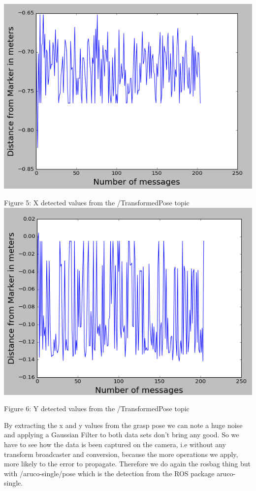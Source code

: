 \documentclass{article}
\begin{document}
\begin{center}
    \includegraphics[scale=0.5]{pic4.png}
    
    Figure 5: X detected values from the /TransformedPose topic
    \includegraphics[scale=0.5]{pic5.png}
    
    Figure 6: Y detected values from the /TransformedPose topic
\end{center}
By extracting the x and y values from the grasp pose we can note a huge noise and applying a Gaussian Filter to both data sets don't bring any good. So we have to see how the data is been captured on the camera, i.e without any transform broadcaster and conversion, because the more operations we apply, more likely to the error to propagate. Therefore we do again the rosbag thing but with /aruco-single/pose which is the detection from the ROS package aruco-single.
\end{document}
